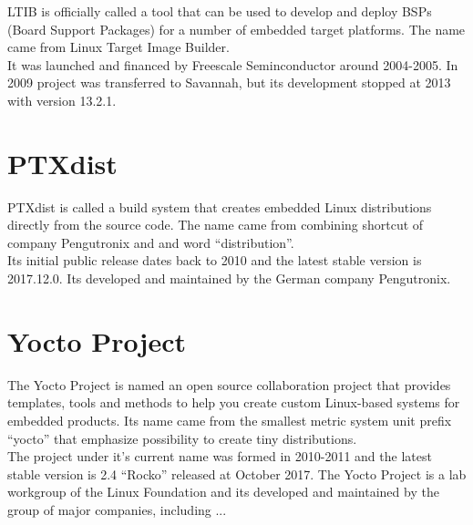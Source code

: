 \documentclass[printmode]{mgr}
\begin{document}

LTIB is officially called a tool that can be used to develop and deploy BSPs (Board Support Packages) for a number of embedded target platforms. The name came from Linux Target Image Builder.
\\
It was launched and financed by Freescale Seminconductor around 2004-2005. In 2009 project was transferred to Savannah, but its development stopped at 2013 with version 13.2.1.

\section{PTXdist}




PTXdist is called a build system that creates embedded Linux distributions directly from the source code. The name came from combining shortcut of company Pengutronix and and word ``distribution''.
\\
Its initial public release dates back to 2010 and the latest stable version is 2017.12.0. Its developed and maintained by the German company Pengutronix.

\section{Yocto Project}

The Yocto Project is named an open source collaboration project that provides templates, tools and methods to help you create custom Linux-based systems for embedded products. Its name came from the smallest metric system unit prefix ``yocto'' that emphasize possibility to create tiny distributions.
\\
The project under it's current name was formed in 2010-2011 and the latest stable version is 2.4 ``Rocko'' released at October 2017. The Yocto Project is a lab workgroup of the Linux Foundation and its developed and maintained by the group of major companies, including ...
\end{document}
